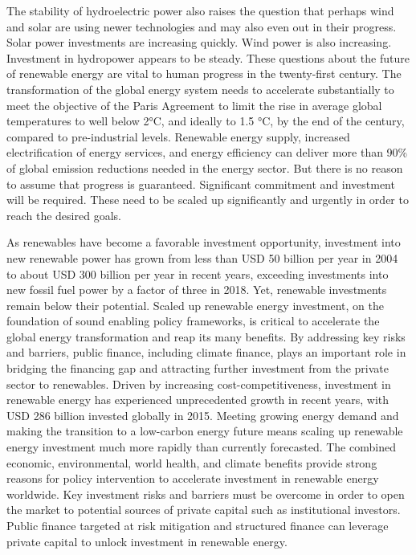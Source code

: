 \documentclass[10pt,twocolumn,letterpaper]{article}
\begin{document}
The stability of hydroelectric power also raises the question that perhaps wind and solar are using newer technologies and may also even out in their progress. Solar power investments are increasing quickly. Wind power is also increasing. Investment in hydropower appears to be steady. These questions about the future of renewable energy are vital to human progress in the twenty-first century. The transformation of the global energy system needs to accelerate substantially to meet the objective of the Paris Agreement to limit the rise in average global temperatures to well below 2°C, and ideally to 1.5 °C, by the end of the century, compared to pre-industrial levels. Renewable energy supply, increased electrification of energy services, and energy efficiency can deliver more than 90\% of global emission reductions needed in the energy sector. But there is no reason to assume that progress is guaranteed. Significant commitment and investment will be required. These need to be scaled up significantly and urgently in order to reach the desired goals.

 As renewables have become a favorable investment opportunity, investment into new renewable power has grown from less than USD 50 billion per year in 2004 to about USD 300 billion per year in recent years, exceeding investments into new fossil fuel power by a factor of three in 2018. Yet, renewable investments remain below their potential. Scaled up renewable energy investment, on the foundation of sound enabling policy frameworks, is critical to accelerate the global energy transformation and reap its many benefits. By addressing key risks and barriers, public finance, including climate finance, plays an important role in bridging the financing gap and attracting further investment from the private sector to renewables. Driven by increasing cost-competitiveness, investment in renewable energy has experienced unprecedented growth in recent years, with USD 286 billion invested globally in 2015. Meeting growing energy demand and making the transition to a low-carbon energy future means scaling up renewable energy investment much more rapidly than currently forecasted. The combined economic, environmental, world health, and climate benefits provide strong reasons for policy intervention to accelerate investment in renewable energy worldwide. Key investment risks and barriers must be overcome in order to open the market to potential sources of private capital such as institutional investors. Public finance targeted at risk mitigation and structured finance can leverage private capital to unlock investment in renewable energy.
\end{document}
